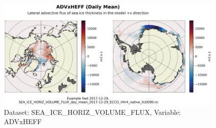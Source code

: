 \begin{figure}[H]
\centering
\includegraphics[scale=0.55]{../images/plots/native_plots/Sea-Ice_and_Snow_Horizontal_Volume_Fluxes/ADVxHEFF.png}
\caption{Dataset: SEA\_ICE\_HORIZ\_VOLUME\_FLUX, Variable: ADVxHEFF}
\label{tab:table-SEA_ICE_HORIZ_VOLUME_FLUX_ADVxHEFF-Plot}
\end{figure}
\pagebreak
